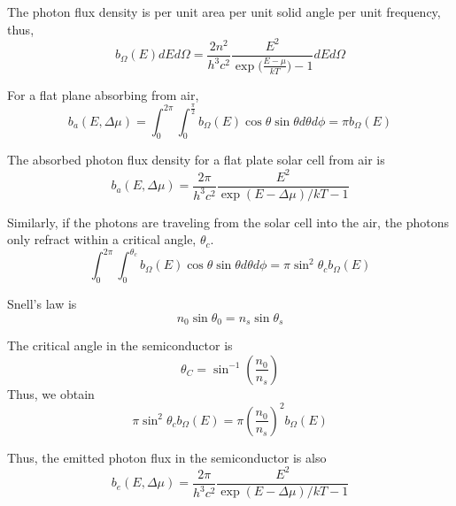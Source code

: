 \documentclass[12pt]{article}
\newcommand{\blue}[1]{\textcolor{blue}{#1}}
\begin{document}
The photon flux density is per unit area per unit solid angle per unit frequency, thus, 
\begin{equation}
b_\Omega(E) dE d\Omega = \frac{2 n^2}{h^3 c^2} \frac{E^2}{\exp{(\frac{E - \mu}{k T}}) -1} dE d\Omega
\end{equation}



For a flat plane absorbing from air,  
\begin{equation}
b_a (E, \Delta \mu) = \int_0^{2 \pi} \int^{\frac{\pi}{2}}_0 b_\Omega(E) \cos \theta \sin \theta d\theta d\phi = \pi b_\Omega(E)
\end{equation}

The absorbed photon flux density for a flat plate solar cell from air is 
\begin{equation}
\boxed{b_a (E, \Delta \mu) = \frac{2 \pi}{h^3 c^2} \frac{E^2}{\exp(E - \Delta \mu)/k T - 1}}
\end{equation}

Similarly, if the photons are traveling from the solar cell into the air, the photons only refract within a critical angle, $\theta_c$.  %
\begin{equation}
\int_0^{2 \pi} \int^{\theta_c}_0 b_\Omega(E) \cos \theta \sin \theta d\theta d\phi = \pi \sin^2\theta_c b_\Omega(E) 
\end{equation}

Snell's law is 
\begin{equation}
n_0 \sin \theta_0 = n_s \sin \theta_s
\end{equation}

The critical angle in the semiconductor is 
\begin{equation}
\theta_C = \sin^{-1} \left (\frac{n_0}{n_s} \right ) 
\end{equation}
Thus, we obtain 
\begin{equation}
\pi \sin^2\theta_c b_\Omega(E)  = \pi \left ( \frac{n_0}{n_s} \right)^2 b_\Omega(E)
\end{equation}

Thus, the emitted photon flux in the semiconductor is also 
\begin{equation}
b_e (E, \Delta \mu) = \frac{2 \pi}{h^3 c^2} \frac{E^2}{\exp(E - \Delta \mu)/k T - 1}
\end{equation}
\end{document}

